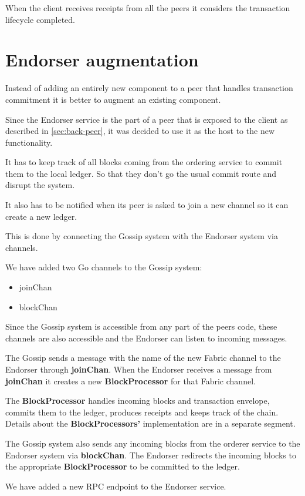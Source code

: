 When the client receives receipts from all the peers it considers the transaction lifecycle completed.

\section{Endorser augmentation}
\label{sec:augm}
Instead of adding an entirely new component to a peer that handles transaction commitment it is better to augment an existing component.

Since the Endorser service is the part of a peer that is exposed to the client as described in \ref{sec:back-peer}, it was decided to use it as the host to the new functionality.

It has to keep track of all blocks coming from the ordering service to commit them to the local ledger. So that they don't go the usual commit route and disrupt the system.

It also has to be notified when its peer is asked to join a new channel so it can create a new ledger.

This is done by connecting the Gossip system with the Endorser system via channels.

We have added two Go channels to the Gossip system:
\begin{itemize}
  \item joinChan
  \item blockChan
\end{itemize}

Since the Gossip system is accessible from any part of the peers code, these channels are also accessible and the Endorser can listen to incoming messages.

The Gossip sends a message with the name of the new Fabric channel to the Endorser through \textbf{joinChan}.
When the Endorser receives a message from \textbf{joinChan} it creates a new \textbf{BlockProcessor} for that Fabric channel.

The \textbf{BlockProcessor} handles incoming blocks and transaction envelope, commits them to the ledger, produces receipts and keeps track of the chain. Details about the \textbf{BlockProcessors'} implementation are in a separate segment.

The Gossip system also sends any incoming blocks from the orderer service to the Endorser system via \textbf{blockChan}.
The Endorser redirects the incoming blocks to the appropriate \textbf{BlockProcessor} to be committed to the ledger.

We have added a new RPC endpoint to the Endorser service.

